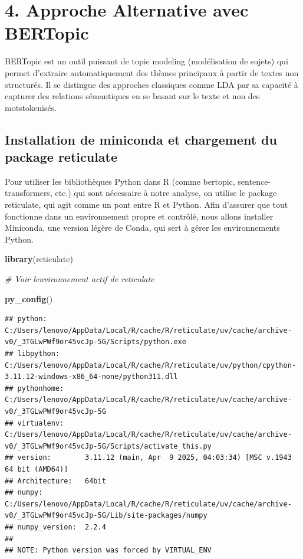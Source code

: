 \documentclass[
]{article}
\newenvironment{Shaded}{\begin{snugshade}}{\end{snugshade}}
\newcommand{\CommentTok}[1]{\textcolor[rgb]{0.56,0.35,0.01}{\textit{#1}}}
\newcommand{\FunctionTok}[1]{\textcolor[rgb]{0.13,0.29,0.53}{\textbf{#1}}}
\newcommand{\NormalTok}[1]{#1}
\begin{document}
\section{4. Approche Alternative avec
BERTopic}\label{approche-alternative-avec-bertopic}

BERTopic est un outil puissant de topic modeling (modélisation de
sujets) qui permet d'extraire automatiquement des thèmes principaux à
partir de textes non structurés. Il se distingue des approches
classiques comme LDA par sa capacité à capturer des relations
sémantiques en se basant sur le texte et non des motstokenisés.

\subsection{Installation de miniconda et chargement du package
reticulate}\label{installation-de-miniconda-et-chargement-du-package-reticulate}

Pour utiliser les bibliothèques Python dans R (comme bertopic,
sentence-transformers, etc.) qui sont nécessaire à notre analyse, on
utilise le package reticulate, qui agit comme un pont entre R et Python.
Afin d'assurer que tout fonctionne dans un environnement propre et
contrôlé, nous allons installer Miniconda, une version légère de Conda,
qui sert à gérer les environnements Python.

\begin{Shaded}
\begin{Highlighting}[]
\FunctionTok{library}\NormalTok{(reticulate)}

\CommentTok{\# Voir l\textquotesingle{}environnement actif de reticulate}

\FunctionTok{py\_config}\NormalTok{()}
\end{Highlighting}
\end{Shaded}

\begin{verbatim}
## python:         C:/Users/lenovo/AppData/Local/R/cache/R/reticulate/uv/cache/archive-v0/_3TGLwPWf9or45vcJp-5G/Scripts/python.exe
## libpython:      C:/Users/lenovo/AppData/Local/R/cache/R/reticulate/uv/python/cpython-3.11.12-windows-x86_64-none/python311.dll
## pythonhome:     C:/Users/lenovo/AppData/Local/R/cache/R/reticulate/uv/cache/archive-v0/_3TGLwPWf9or45vcJp-5G
## virtualenv:     C:/Users/lenovo/AppData/Local/R/cache/R/reticulate/uv/cache/archive-v0/_3TGLwPWf9or45vcJp-5G/Scripts/activate_this.py
## version:        3.11.12 (main, Apr  9 2025, 04:03:34) [MSC v.1943 64 bit (AMD64)]
## Architecture:   64bit
## numpy:          C:/Users/lenovo/AppData/Local/R/cache/R/reticulate/uv/cache/archive-v0/_3TGLwPWf9or45vcJp-5G/Lib/site-packages/numpy
## numpy_version:  2.2.4
## 
## NOTE: Python version was forced by VIRTUAL_ENV
\end{verbatim}
\end{document}
